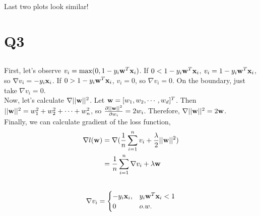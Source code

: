 \documentclass{article}
\begin{document}
Last two plots look similar!

\section{Q3}

\subsection{}
First, let's observe $v_i = \max(0,1-y_i\bold{w}^T\bold{x}_i)$.
If $0 < 1-y_i\bold{w}^T\bold{x}_i$,
$v_i = 1 - y_i\bold{w}^T\bold{x}_i$,
so $\nabla{v_i} = -y_i\bold{x}_i$.
If $0 > 1-y_i\bold{w}^T\bold{x}_i$,
$v_i = 0$, so $\nabla{v_i} = 0$.
On the boundary, just take $\nabla{v_i} = 0$. \\ 

Now, let's calculate $\nabla{||\bold{w}||^2}$.
Let $\bold{w}=[w_1,w_2,\cdots,w_d]^T$.
Then $||\bold{w}||^2 = w_1^2 + w_2^2 + \cdots + w_n^2$,
    so $\frac{\partial{||\bold{w}||^2}}{\partial{w_i}} = 2w_i$.
Therefore, $\nabla{||\bold{w}||^2} = 2\bold{w}$. \\

Finally, we can calculate gradient of the loss function,
\begin{align*}
    \nabla{l(\bold{w})}
    &= \nabla(\frac{1}{n}\sum\limits_{i=1}^n v_i + \frac{\lambda}{2}||\bold{w}||^2) \\
    &= \frac{1}{n}\sum\limits_{i=1}^n \nabla v_i + \lambda\bold{w} \\
    \\
\end{align*}
\begin{align*}
    \nabla v_i =
    \begin{cases}
        -y_i\bold{x}_i, & y_i\bold{w}^T\bold{x}_i < 1 \\
        0 & o.w.
    \end{cases}
\end{align*}

\end{document}
